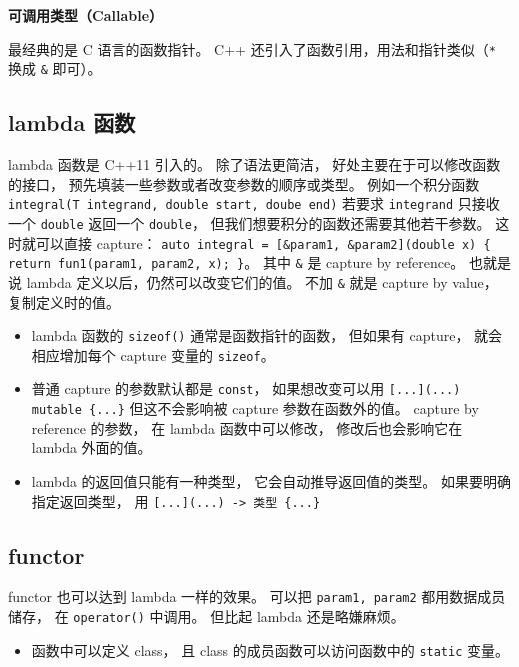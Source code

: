 

\textbf{可调用类型（Callable）}

最经典的是 C 语言的函数指针。 C++ 还引入了函数引用，用法和指针类似（\verb|*| 换成 \verb|&| 即可）。

\subsection{lambda 函数}
lambda 函数是 C++11 引入的。 除了语法更简洁， 好处主要在于可以修改函数的接口， 预先填装一些参数或者改变参数的顺序或类型。 例如一个积分函数 \verb|integral(T integrand, double start, doube end)| 若要求 \verb|integrand| 只接收一个 \verb|double| 返回一个 \verb|double|， 但我们想要积分的函数还需要其他若干参数。 这时就可以直接 capture： \verb|auto integral = [&param1, &param2](double x) { return fun1(param1, param2, x); }|。 其中 \verb|&| 是 capture by reference。 也就是说 lambda 定义以后，仍然可以改变它们的值。 不加 \verb|&| 就是 capture by value， 复制定义时的值。

\begin{itemize}
\item lambda 函数的 \verb|sizeof()| 通常是函数指针的函数， 但如果有 capture， 就会相应增加每个 capture 变量的 \verb|sizeof|。
\item 普通 capture 的参数默认都是 \verb|const|， 如果想改变可以用 \verb|[...](...) mutable {...}| 但这不会影响被 capture 参数在函数外的值。 capture by reference 的参数， 在 lambda 函数中可以修改， 修改后也会影响它在 lambda 外面的值。
\item lambda 的返回值只能有一种类型， 它会自动推导返回值的类型。 如果要明确指定返回类型， 用 \verb|[...](...) -> 类型 {...}|
\end{itemize}

\subsection{functor}
functor 也可以达到 lambda 一样的效果。 可以把 \verb|param1, param2| 都用数据成员储存， 在 \verb|operator()| 中调用。 但比起 lambda 还是略嫌麻烦。

\begin{itemize}
\item 函数中可以定义 class， 且 class 的成员函数可以访问函数中的 \verb|static| 变量。
\end{itemize}
